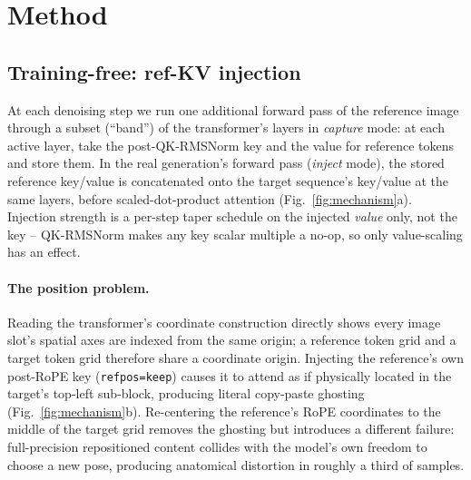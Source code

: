 \section{Method}\label{sec:method}

\subsection{Training-free: ref-KV injection}\label{sec:method-tf}

At each denoising step we run one additional forward pass of the
reference image through a subset (``band'') of the transformer's layers
in \emph{capture} mode: at each active layer, take the post-QK-RMSNorm
key and the value for reference tokens and store them. In the real
generation's forward pass (\emph{inject} mode), the stored reference
key/value is concatenated onto the target sequence's key/value at the
same layers, before scaled-dot-product attention (Fig.~\ref{fig:mechanism}a).
Injection strength is a per-step taper schedule on the injected
\emph{value} only, not the key -- QK-RMSNorm makes any key scalar
multiple a no-op, so only value-scaling has an effect.

\paragraph{The position problem.} Reading the transformer's coordinate
construction directly shows every image slot's spatial axes are indexed
from the same origin; a reference token grid and a target token grid
therefore share a coordinate origin. Injecting the reference's own
post-RoPE key (\texttt{refpos=keep}) causes it to attend as if physically
located in the target's top-left sub-block, producing literal
copy-paste ghosting (Fig.~\ref{fig:mechanism}b). Re-centering the
reference's RoPE coordinates to the middle of the target grid removes
the ghosting but introduces a different failure: full-precision
repositioned content collides with the model's own freedom to choose a
new pose, producing anatomical distortion in roughly a third of samples.

